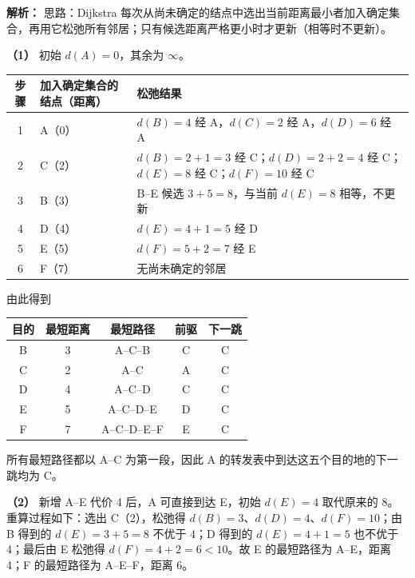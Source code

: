 \begin{enumerate}[start=7]
\ifshowsolutions\par\noindent\textbf{解析：} 思路：Dijkstra 每次从尚未确定的结点中选出当前距离最小者加入确定集合，再用它松弛所有邻居；只有候选距离严格更小时才更新（相等时不更新）。

\textbf{（1）} 初始 $d(A)=0$，其余为 $\infty$。

\begin{center}
\small
\begin{tabularx}{\linewidth}{c p{4.4cm} X}
\toprule
步骤 & 加入确定集合的结点（距离） & 松弛结果 \\
\midrule
1 & A（0） & $d(B)=4$ 经 A，$d(C)=2$ 经 A，$d(D)=6$ 经 A \\
2 & C（2） & $d(B)=2+1=3$ 经 C；$d(D)=2+2=4$ 经 C；$d(E)=8$ 经 C；$d(F)=10$ 经 C \\
3 & B（3） & B--E 候选 $3+5=8$，与当前 $d(E)=8$ 相等，不更新 \\
4 & D（4） & $d(E)=4+1=5$ 经 D \\
5 & E（5） & $d(F)=5+2=7$ 经 E \\
6 & F（7） & 无尚未确定的邻居 \\
\bottomrule
\end{tabularx}
\end{center}

由此得到
\begin{center}
\begin{tabular}{ccccc}
\toprule
目的 & 最短距离 & 最短路径 & 前驱 & 下一跳 \\
\midrule
B & 3 & A--C--B & C & C \\
C & 2 & A--C & A & C \\
D & 4 & A--C--D & C & C \\
E & 5 & A--C--D--E & D & C \\
F & 7 & A--C--D--E--F & E & C \\
\bottomrule
\end{tabular}
\end{center}
所有最短路径都以 A--C 为第一段，因此 A 的转发表中到达这五个目的地的下一跳均为 C。

\textbf{（2）} 新增 A--E 代价 4 后，A 可直接到达 E，初始 $d(E)=4$ 取代原来的 8。重算过程如下：选出 C（2），松弛得 $d(B)=3$、$d(D)=4$、$d(F)=10$；由 B 得到的 $d(E)=3+5=8$ 不优于 4；D 得到的 $d(E)=4+1=5$ 也不优于 4；最后由 E 松弛得 $d(F)=4+2=6<10$。故 E 的最短路径为 A--E，距离 4；F 的最短路径为 A--E--F，距离 6。


\end{enumerate}
